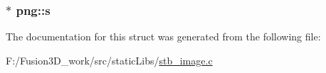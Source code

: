 \subsubsection[{s}]{$\ast$ png\+::s}\label{structpng_a77d3bfd0ae8f598a475317ed39e78fd0}


The documentation for this struct was generated from the following file\+:\begin{DoxyCompactItemize}
\item 
F\+:/\+Fusion3\+D\+\_\+work/src/static\+Libs/\hyperlink{stb__image_8c}{stb\+\_\+image.\+c}\end{DoxyCompactItemize}
